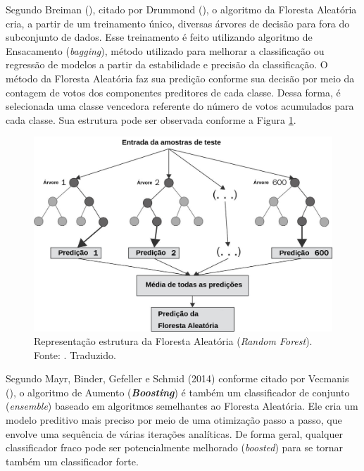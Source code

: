 Segundo Breiman (\citeyear{Breiman:2001:RF:570181.570182}), citado por Drummond (\citeyear{Drummond:2017}), o algoritmo da Floresta Aleatória cria, a partir de um treinamento único, diversas árvores de decisão para fora do subconjunto de dados. Esse treinamento é feito utilizando algoritmo de Ensacamento (\textit{bagging}), método utilizado para melhorar a classificação ou regressão de modelos a partir da estabilidade e precisão da classificação. O método da Floresta Aleatória faz sua predição conforme sua decisão por meio da contagem de votos dos componentes preditores de cada classe. Dessa forma, é selecionada uma classe vencedora referente do número de votos acumulados para cada classe. Sua estrutura pode ser observada conforme a Figura \ref{fig:random_forest}.

\begin{figure}[H]
    \centering
    \includegraphics[scale=0.3]{figuras/referencial_teorico/random_forest.png}
    \caption[Estrutura do random forest]{Representação estrutura da Floresta Aleatória (\textit{Random Forest}). Fonte: \cite{Chakure:2019}. Traduzido.}
    \label{fig:random_forest}
\end{figure}

Segundo Mayr, Binder, Gefeller e Schmid (2014) conforme citado por Vecmanis (\citeyear{Vecmanis:2019}), o algoritmo de Aumento (\textbf{\textit{Boosting}}) é também um classificador de conjunto (\textit{ensemble}) baseado em algoritmos semelhantes ao Floresta Aleatória. Ele cria um modelo preditivo mais preciso por meio de uma otimização passo a passo, que envolve uma sequência de várias iterações analíticas. De forma geral, qualquer classificador fraco pode ser potencialmente melhorado (\textit{boosted}) para se tornar também um classificador forte.

